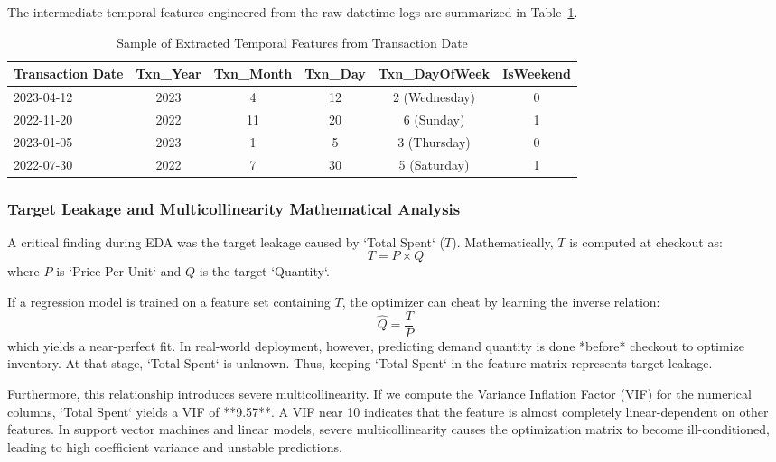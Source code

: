 \documentclass[12pt,a4paper]{article}
\begin{document}
The intermediate temporal features engineered from the raw datetime logs are summarized in Table~\ref{tab:temporal_features}.
\begin{table}[H]
\centering
\caption{Sample of Extracted Temporal Features from Transaction Date}
\label{tab:temporal_features}
\begin{tabular}{lccccc}
\toprule
\textbf{Transaction Date} & \textbf{Txn\_Year} & \textbf{Txn\_Month} & \textbf{Txn\_Day} & \textbf{Txn\_DayOfWeek} & \textbf{IsWeekend} \\
\midrule
2023-04-12 & 2023 & 4 & 12 & 2 (Wednesday) & 0 \\
2022-11-20 & 2022 & 11 & 20 & 6 (Sunday) & 1 \\
2023-01-05 & 2023 & 1 & 5 & 3 (Thursday) & 0 \\
2022-07-30 & 2022 & 7 & 30 & 5 (Saturday) & 1 \\
\bottomrule
\end{tabular}
\end{table}

\subsubsection{Target Leakage and Multicollinearity Mathematical Analysis}
A critical finding during EDA was the target leakage caused by `Total Spent` ($T$). Mathematically, $T$ is computed at checkout as:
\[
T = P \times Q
\]
where $P$ is `Price Per Unit` and $Q$ is the target `Quantity`. 

If a regression model is trained on a feature set containing $T$, the optimizer can cheat by learning the inverse relation:
\[
\hat{Q} = \frac{T}{P}
\]
which yields a near-perfect fit. In real-world deployment, however, predicting demand quantity is done *before* checkout to optimize inventory. At that stage, `Total Spent` is unknown. Thus, keeping `Total Spent` in the feature matrix represents target leakage.

Furthermore, this relationship introduces severe multicollinearity. If we compute the Variance Inflation Factor (VIF) for the numerical columns, `Total Spent` yields a VIF of **9.57**. A VIF near 10 indicates that the feature is almost completely linear-dependent on other features. In support vector machines and linear models, severe multicollinearity causes the optimization matrix to become ill-conditioned, leading to high coefficient variance and unstable predictions.
\end{document}

